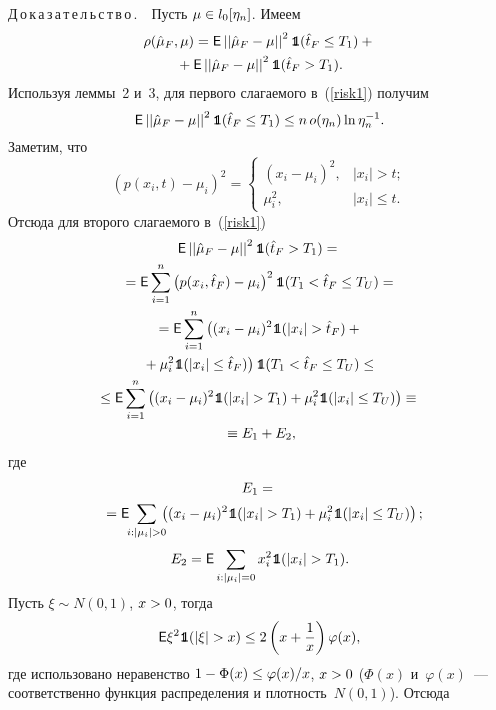 \begin{multicols}{2}
\noindent
Д\,о\,к\,а\,з\,а\,т\,е\,л\,ь\,с\,т\,в\,о\,.\ \ Пусть $\mu \hm\in l_0[\eta_n]$. Имеем
\begin{multline}
\label{risk1}
\rho(\hat{\mu}_F, \mu) = {\sf E} \left|\left| \hat{\mu}_F - \mu\right|\right|^2 
\mbox{{{\tt 1}}\hspace{-1.3mm}{\sf 1}}(\hat{t}_F\leq T_1) + {}\\
{}+{\sf E} \left|\left| \hat{\mu}_F - \mu\right|\right|^2 
\mbox{{{\tt 1}}\hspace{-1.3mm}{\sf 1}}(\hat{t}_F > T_1).
\end{multline}
Используя леммы~2 и~3, для первого слагаемого в~(\ref{risk1}) 
получим
\begin{equation}
\label{proof1}
{\sf E} \left|\left| \hat{\mu}_F - \mu\right|\right|^2 \mbox{{{\tt 1}}\hspace{-1.3mm}{\sf 1}}(\hat{t}_F\leq T_1) \leq n 
\, o(\eta_n) \ln \eta_n^{-1}.
\end{equation}
Заметим, что
\begin{equation*}
\left(p(x_i, t)-\mu_i\right)^2 =
 \begin{cases}
   (x_i-\mu_i)^2, & |x_i| > t;\\
   \mu_i^2, & |x_i| \leq t.
 \end{cases}
\end{equation*}
Отсюда для второго слагаемого в~(\ref{risk1})
\begin{multline*}
\e \left|\left| \hat{\mu}_F - \mu\right|\right|^2 \Ik(\hat{t}_F > T_1) = {}\\
{}=
\e  \sum\limits_{i=1}^n \left(p(x_i, \hat{t}_F)-\mu_i\right)^2  \Ik(T_1 < \hat{t}_F  
\leq T_U) ={}\\
{}= \e  \sum\limits_{i=1}^n \left((x_i-\mu_i)^2 \Ik(|x_i| >\hat{t}_F) + {}\right.\\
\left.{}+\mu_i^2 
\Ik(|x_i| \leq \hat{t}_F)\right) \Ik(T_1 < \hat{t}_F  \leq T_U) \leq{}\\
\!{}\leq \e  \sum\limits_{i=1}^n \left((x_i-\mu_i)^2 \Ik(|x_i| >T_1) + \mu_i^2 
\Ik(|x_i| \leq T_U)\right) \equiv{}\\
{}\equiv E_1+E_2,
\end{multline*}
где
\begin{multline*}
E_1 ={}\\
\!{}= \e \!\! \sum\limits_{i : |\mu_i| > 0}\!\!\! \left((x_i-\mu_i)^2 \Ik(|x_i| >T_1) + 
\mu_i^2 \Ik(|x_i| \leq T_U)\right);\hspace*{-6.19644pt}
\end{multline*}
$$
E_2 = {\sf E}  \sum\limits_{i : |\mu_i| =0} x_i^2 \mbox{{{\tt 1}}\hspace{-1.3mm}{\sf 1}}(|x_i| >T_1).
$$
Пусть $\xi \sim N(0,1)$, $x\hm>0$, тогда
$$
\e \xi^2 \Ik
(|\xi|>x)  \leq 2\left(x + \fr{1}{x}\right)\varphi(x),
$$
где использовано неравенство $1\hm-\Phi(x)\hm\leq\varphi(x)/x$, $x\hm>0$ ($\Phi(x)$ 
и~$\varphi(x)$~--- соответственно функция распределения и плот\-ность~$N(0,1)$). 
Отсюда


\end{multicols}
